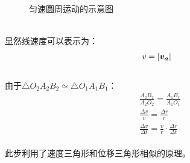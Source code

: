 \documentclass[UTF8]{ctexart}
\newcommand*{\veb}[1]{\vb*{#1}}
\begin{document}
\begin{figure}[h]
\begin{center}
{\begin{minipage}[t]{0.27\linewidth}
                \end{minipage}
            }
            \caption{匀速圆周运动的示意图}
        \end{center}
    \end{figure}\\
    显然线速度可以表示为：
    \setcounter{equation}{0}
    \begin{align}
        v=|\veb{v_a}|
    \end{align}\\
    由于$\triangle O_2A_2B_2\simeq\triangle O_1A_1B_1$：\vspace{5pt}
    \begin{align}
        &\frac{A_2B_2}{A_2O_2}=\frac{A_1B_1}{A_1O_1}\\[3mm]
        &\frac{\Delta v}{v}=\frac{\Delta r}{r}\\[3mm]
        &\frac{\Delta v}{\Delta t}=\frac{v}{r}\cdot\frac{\Delta r}{\Delta t}
    \end{align}\\
    此步利用了速度三角形和位移三角形相似的原理。

\newpage
\end{document}
